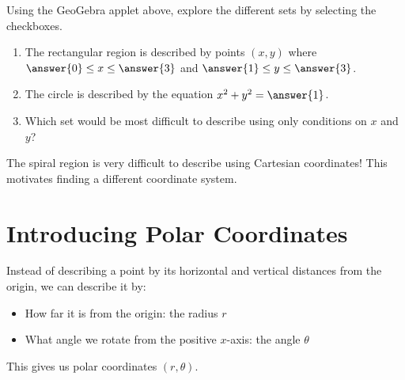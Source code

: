 \documentclass{ximera}
\begin{document}
\begin{problem}
    Using the GeoGebra applet above, explore the different sets by selecting the checkboxes.
    
    \begin{enumerate}
        \item The rectangular region is described by points $(x,y)$ where $\answer{0} \leq x \leq \answer{3}$ and $\answer{1} \leq y \leq \answer{3}$.
        
        \item The circle is described by the equation $x^2 + y^2 = \answer{1}$.
        
        \item Which set would be most difficult to describe using only conditions on $x$ and $y$?
        \begin{multipleChoice}
        \end{multipleChoice}
    \end{enumerate}
    
    \begin{feedback}
        The spiral region is very difficult to describe using Cartesian coordinates! This motivates finding a different coordinate system.
    \end{feedback}
\end{problem}

\section*{Introducing Polar Coordinates}

Instead of describing a point by its horizontal and vertical distances from the origin, we can describe it by:
\begin{itemize}
    \item How far it is from the origin: the radius $r$
    \item What angle we rotate from the positive $x$-axis: the angle $\theta$
\end{itemize}

This gives us polar coordinates $(r,\theta)$.

\begin{center}
\end{center}
\end{document}
